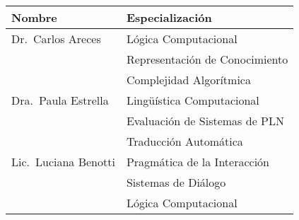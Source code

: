 
\begin{center}\small
    \begin{minipage}{\linewidth}
        \begin{center}
        \begin{tabular}{|l|l|}
        \hline\hline
        Nombre &  Especializaci\'on \\
        \hline
        Dr.\ Carlos Areces &
          L\'ogica Computacional\\
        & Representaci\'on de Conocimiento\\
        & Complejidad Algor\'itmica
      \\ \hline
        Dra.\ Paula Estrella &
          Ling\"u\'istica Computacional \\
        & Evaluaci\'on de Sistemas de PLN
      \\
		& Traducci\'on Autom\'atica \\ \hline
        Lic.\ Luciana Benotti &
          Pragm\'atica de la Interacci\'on\\
        & Sistemas de Di\'alogo\\
        & L\'ogica Computacional\\
        \hline\hline
        \end{tabular}
        \end{center}
    \end{minipage}
\end{center}

